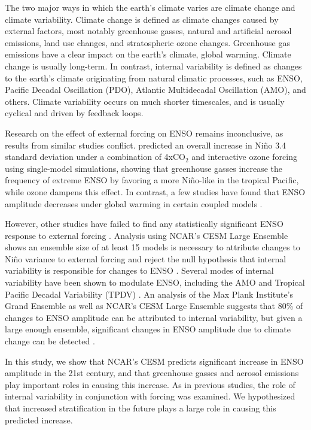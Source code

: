 \documentclass[11pt]{article}
\begin{document}
The two major ways in which the earth's climate varies are climate change and climate variability. Climate change is defined as climate changes caused by external factors, most notably greenhouse gasses, natural and artificial aerosol emissions, land use changes, and stratospheric ozone changes. Greenhouse gas emissions have a clear impact on the earth's climate, global warming. Climate change is usually long-term. In contrast, internal variability is defined as changes to the earth's climate originating from natural climatic processes, such as ENSO, Pacific Decadal Oscillation (PDO), Atlantic Multidecadal Oscillation (AMO), and others. Climate variability occurs on much shorter timescales, and is usually cyclical and driven by feedback loops.

Research on the effect of external forcing on ENSO remains inconclusive, as results from similar studies conflict. \citet{nowack2017role} predicted an overall increase in Niño 3.4 standard deviation under a combination of 4xCO\(_2\) and interactive ozone forcing using single-model simulations, showing that greenhouse gasses increase the frequency of extreme ENSO by favoring a more Niño-like in the tropical Pacific, while ozone dampens this effect. In contrast, a few studies have found that ENSO amplitude decreases under global warming in certain coupled models \citep{kohyama2018weakening}.

However, other studies have failed to find any statistically significant ENSO response to external forcing \citep{stevenson2012significant}. Analysis using NCAR's CESM Large Ensemble shows an ensemble size of at least 15 models is necessary to attribute changes to Niño variance to external forcing and reject the null hypothesis that internal variability is responsible for changes to ENSO \citep{zheng2017response}. Several modes of internal variability have been shown to modulate ENSO, including the AMO \citep{levine2017impact} and Tropical Pacific Decadal Variability (TPDV) \citep{zheng2017response}. An analysis of the Max Plank Institute's Grand Ensemble as well as NCAR's CESM Large Ensemble suggests that 80\% of changes to ENSO amplitude can be attributed to internal variability, but given a large enough ensemble, significant changes in ENSO amplitude due to climate change can be detected \citep{maher2018enso}.

In this study, we show that NCAR's CESM predicts significant increase in ENSO amplitude in the 21st century, and that greenhouse gasses and aerosol emissions play important roles in causing this increase. As in previous studies, the role of internal variability in conjunction with forcing was examined. We hypothesized that increased stratification in the future plays a large role in causing this predicted increase.
\end{document}
